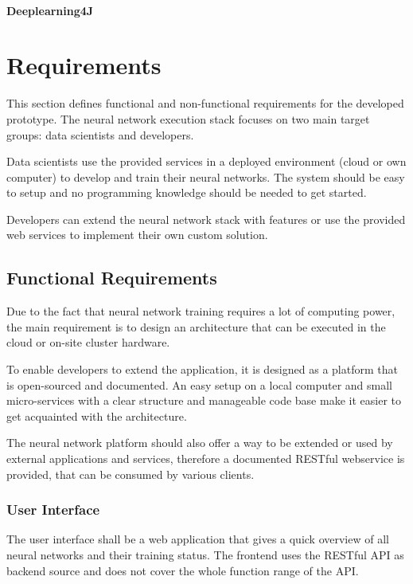 \subsubsection{Deeplearning4J}\label{deeplearning4j}

\chapter{Requirements}\label{requirements}

This section defines functional and non-functional requirements for the
developed prototype. The neural network execution stack focuses on two
main target groups: data scientists and developers.

Data scientists use the provided services in a deployed environment
(cloud or own computer) to develop and train their neural networks. The
system should be easy to setup and no programming knowledge should be
needed to get started.

Developers can extend the neural network stack with features or use the
provided web services to implement their own custom solution.

\section{Functional Requirements}\label{functional-requirements}

Due to the fact that neural network training requires a lot of computing
power, the main requirement is to design an architecture that can be
executed in the cloud or on-site cluster hardware.

To enable developers to extend the application, it is designed as a
platform that is open-sourced and documented. An easy setup on a local
computer and small micro-services with a clear structure and manageable
code base make it easier to get acquainted with the architecture.

The neural network platform should also offer a way to be extended or
used by external applications and services, therefore a documented
RESTful webservice is provided, that can be consumed by various clients.

\subsection{User Interface}\label{user-interface}

The user interface shall be a web application that gives a quick
overview of all neural networks and their training status. The frontend
uses the RESTful API as backend source and does not cover the whole
function range of the API.


